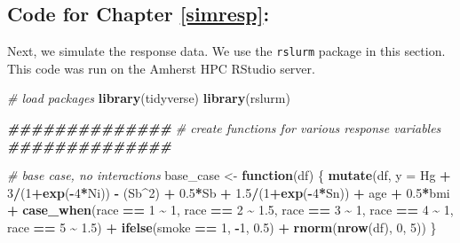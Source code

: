 \documentclass[12pt, twoside]{amherstthesis}
\newenvironment{Shaded}{\begin{snugshade}}{\end{snugshade}}
\newcommand{\AttributeTok}[1]{\textcolor[rgb]{0.13,0.29,0.53}{#1}}
\newcommand{\CommentTok}[1]{\textcolor[rgb]{0.56,0.35,0.01}{\textit{#1}}}
\newcommand{\ControlFlowTok}[1]{\textcolor[rgb]{0.13,0.29,0.53}{\textbf{#1}}}
\newcommand{\DecValTok}[1]{\textcolor[rgb]{0.00,0.00,0.81}{#1}}
\newcommand{\DocumentationTok}[1]{\textcolor[rgb]{0.56,0.35,0.01}{\textbf{\textit{#1}}}}
\newcommand{\FloatTok}[1]{\textcolor[rgb]{0.00,0.00,0.81}{#1}}
\newcommand{\FunctionTok}[1]{\textcolor[rgb]{0.13,0.29,0.53}{\textbf{#1}}}
\newcommand{\NormalTok}[1]{#1}
\newcommand{\OtherTok}[1]{\textcolor[rgb]{0.56,0.35,0.01}{#1}}
\newcommand{\SpecialCharTok}[1]{\textcolor[rgb]{0.81,0.36,0.00}{\textbf{#1}}}
\begin{document}
\hypertarget{code-for-chapter-refsimresp}{%
\subsection{Code for Chapter \ref{simresp}:}\label{code-for-chapter-refsimresp}}

Next, we simulate the response data. We use the \texttt{rslurm} package in this section. This code was run on the Amherst HPC RStudio server.
\begin{Shaded}
\begin{Highlighting}[]
\CommentTok{\# load packages}
\FunctionTok{library}\NormalTok{(tidyverse)}
\FunctionTok{library}\NormalTok{(rslurm)}
\end{Highlighting}
\end{Shaded}
\begin{Shaded}
\begin{Highlighting}[]
\DocumentationTok{\#\#\#\#\#\#\#\#\#\#\#\#\#\#}
\CommentTok{\# create functions for various response variables}
\DocumentationTok{\#\#\#\#\#\#\#\#\#\#\#\#\#\#}

\CommentTok{\# base case, no interactions}
\NormalTok{base\_case }\OtherTok{\textless{}{-}} \ControlFlowTok{function}\NormalTok{(df) \{}
  \FunctionTok{mutate}\NormalTok{(df, }\AttributeTok{y =} 
\NormalTok{           Hg }\SpecialCharTok{+} \DecValTok{3}\SpecialCharTok{/}\NormalTok{(}\DecValTok{1}\SpecialCharTok{+}\FunctionTok{exp}\NormalTok{(}\SpecialCharTok{{-}}\DecValTok{4}\SpecialCharTok{*}\NormalTok{Ni)) }\SpecialCharTok{{-}}\NormalTok{ (Sb}\SpecialCharTok{\^{}}\DecValTok{2}\NormalTok{) }\SpecialCharTok{+} \FloatTok{0.5}\SpecialCharTok{*}\NormalTok{Sb }\SpecialCharTok{+} \FloatTok{1.5}\SpecialCharTok{/}\NormalTok{(}\DecValTok{1}\SpecialCharTok{+}\FunctionTok{exp}\NormalTok{(}\SpecialCharTok{{-}}\DecValTok{4}\SpecialCharTok{*}\NormalTok{Sn)) }\SpecialCharTok{+} 
\NormalTok{           age }\SpecialCharTok{+} \FloatTok{0.5}\SpecialCharTok{*}\NormalTok{bmi }\SpecialCharTok{+} 
           \FunctionTok{case\_when}\NormalTok{(race }\SpecialCharTok{==} \DecValTok{1} \SpecialCharTok{\textasciitilde{}} \DecValTok{1}\NormalTok{, }
\NormalTok{                     race }\SpecialCharTok{==} \DecValTok{2} \SpecialCharTok{\textasciitilde{}} \FloatTok{1.5}\NormalTok{, }
\NormalTok{                     race }\SpecialCharTok{==} \DecValTok{3} \SpecialCharTok{\textasciitilde{}} \DecValTok{1}\NormalTok{, }
\NormalTok{                     race }\SpecialCharTok{==} \DecValTok{4} \SpecialCharTok{\textasciitilde{}} \DecValTok{1}\NormalTok{, }
\NormalTok{                     race }\SpecialCharTok{==} \DecValTok{5} \SpecialCharTok{\textasciitilde{}} \FloatTok{1.5}\NormalTok{) }\SpecialCharTok{+}
           \FunctionTok{ifelse}\NormalTok{(smoke }\SpecialCharTok{==} \DecValTok{1}\NormalTok{, }\SpecialCharTok{{-}}\DecValTok{1}\NormalTok{, }\FloatTok{0.5}\NormalTok{) }\SpecialCharTok{+}
           \FunctionTok{rnorm}\NormalTok{(}\FunctionTok{nrow}\NormalTok{(df), }\DecValTok{0}\NormalTok{, }\DecValTok{5}\NormalTok{))}
\NormalTok{\}}


\end{Highlighting}
\end{Shaded}
\end{document}
